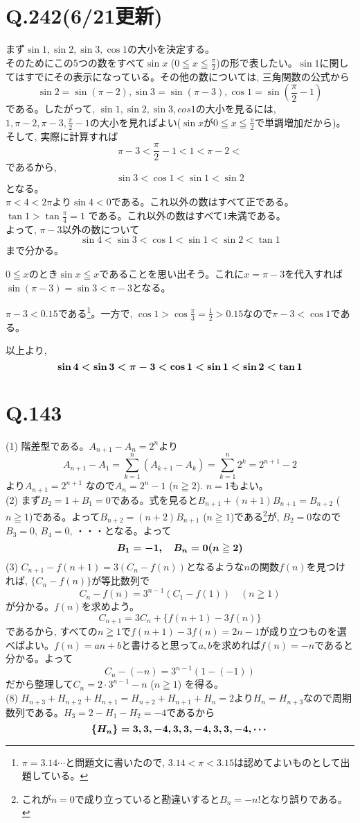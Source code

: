 \documentclass[twocolumn]{jbook}
\newcommand{\bolm}[1]{{\mbox{\boldmath $#1$}}}
\newcommand{\disp}{\displaystyle}
\renewcommand{\leq}{\leqq}
\renewcommand{\geq}{\geqq}
\begin{document}
\section*{Q.242(6/21更新)}
まず$\sin{1},\sin{2},\sin{3},\cos{1}$の大小を決定する。\\
そのためにこの5つの数をすべて$\sin{x}$ ($0\leq x\leq \frac{\pi}{2}$)の形で表したい。$\sin{1}$に関してはすでにその表示になっている。その他の数については, 三角関数の公式から
\[\sin{2} = \sin{(\pi-2)}, \sin{3} = \sin{(\pi-3)}, \cos{1} = \sin{(\frac{\pi}{2} - 1)}\]
である。したがって, $\sin{1},\sin{2}, \sin{3}, cos{1}$の大小を見るには, $1,\pi-2, \pi-3, \frac{\pi}{2} - 1$の大小を見ればよい($\sin{x}$が$0\leq x\leq \frac{\pi}{2}$で単調増加だから)。そして, 実際に計算すれば
\[\pi-3 <  \dfrac{\pi}{2} - 1 < 1 <  \pi-2 < \]
であるから, 
\[\sin{3} < \cos{1} < \sin{1} < \sin{2}\]
となる。\\
$\pi < 4 < 2\pi$より$\sin{4} < 0$である。これ以外の数はすべて正である。\\
$\tan{1} > \tan{\frac{\pi}{4}} = 1$ である。これ以外の数はすべて$1$未満である。\\
よって, $\pi-3$以外の数について
\[\sin{4} < \sin{3} < \cos{1} < \sin{1} < \sin{2} < \tan{1}\]
まで分かる。\par
$0\leq x$のとき$\sin{x} \leq x$であることを思い出そう。これに$x=\pi-3$を代入すれば
$\sin{(\pi-3)} = \sin{3} < \pi-3$となる。\par
$\pi-3 < 0.15$である\footnote{$\pi=3.14\cdots$と問題文に書いたので, $3.14<\pi<3.15$は認めてよいものとして出題している。}。一方で, $\cos{1} > \cos{\frac{\pi}{3}}  = \frac{1}{2} > 0.15$なので$\pi-3< \cos{1}$である。\par
以上より, 
\[\bolm{\sin{4} < \sin{3} < \pi-3 < \cos{1} < \sin{1} < \sin{2} < \tan{1}}\]
\clearpage
\section{Q.143}
(1) 階差型である。$A_{n+1} - A_n = 2^{n}$より
\[A_{n+1} - A_1= \disp\sum_{k=1}^{n} (A_{k+1} - A_k) = \disp\sum_{k=1}^{n} 2^{k} = 2^{n+1} - 2\]
より$A_{n+1} = 2^{n+1}$ なので$A_n = 2^{n}-1$ ($n\geq 2$). $n=1$もよい。\\
(2) まず$B_2 = 1+B_1 = 0$である。式を見ると$B_{n+1} + (n+1)B_{n+1} =B_{n+2}$ ($n\geq 1$)である。よって$B_{n+2} = (n+2)B_{n+1}$ ($n\geq 1$)である\footnote{これが$n=0$で成り立っていると勘違いすると$B_{n} = -n!$となり誤りである。}が, $B_2 = 0$なので$B_3=0$, $B_4=0$, ・・・となる。よって
\[\bolm{B_1 = -1, \quad B_n = 0 (n\geq 2)}\]
(3) $C_{n+1} - f(n+1) = 3(C_n - f(n))$となるような$n$の関数$f(n)$を見つければ, $\{ C_{n} - f(n) \}$が等比数列で
\[C_{n} - f(n) = 3^{n-1}(C_1 - f(1))\quad (n\geq 1)\]
が分かる。$f(n)$を求めよう。
\[C_{n+1} = 3C_{n} + \{f(n+1) - 3f(n)\}\]
であるから, すべての$n\geq 1$で$f(n+1) - 3f(n) = 2n-1$が成り立つものを選べばよい。$f(n) = an+b$と書けると思って$a,b$を求めれば$f(n) = -n$であると分かる。よって
\[C_n  - (-n) = 3^{n-1}(1- (-1))\]
だから整理して$C_n = 2\cdot 3^{n-1} - n$ ($n\geq 1$) を得る。\\
(8) $H_{n+3} + H_{n+2} + H_{n+1} = H_{n+2} + H_{n+1} + H_{n} = 2$より$H_{n} = H_{n+3}$なので周期数列である。$H_3 = 2 - H_1 - H_2 = -4$であるから
\[\bolm{\{ H_n \} = 3,3,-4,3,3,-4,3,3,-4,\cdots} \]
\end{document}

